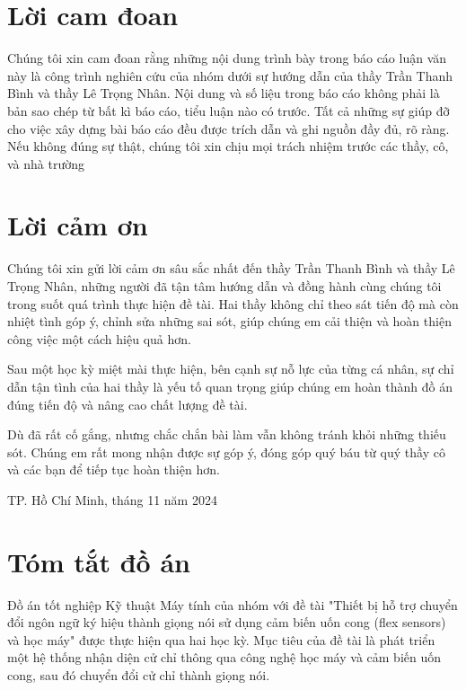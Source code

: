 \documentclass[a4paper]{article}
\begin{document}
\setcounter{page}{1}

\newpage
\section*{Lời cam đoan}

\indent Chúng tôi xin cam đoan rằng những nội dung trình bày trong báo cáo luận văn này là công trình nghiên cứu của nhóm dưới sự hướng dẫn của thầy Trần Thanh Bình và thầy Lê Trọng Nhân. Nội dung và số liệu trong báo cáo không phải là bản sao chép từ bất kì báo cáo, tiểu luận nào có trước. Tất cả những sự giúp đỡ cho việc xây dựng bài báo cáo đều được trích dẫn và ghi nguồn đầy đủ, rõ ràng. Nếu không đúng sự thật, chúng tôi xin chịu mọi trách nhiệm trước các thầy, cô, và nhà trường

\newpage
\section*{Lời cảm ơn}

\indent Chúng tôi xin gửi lời cảm ơn sâu sắc nhất đến thầy Trần Thanh Bình và thầy Lê Trọng Nhân, những người đã tận tâm hướng dẫn và đồng hành cùng chúng tôi trong suốt quá trình thực hiện đề tài. Hai thầy không chỉ theo sát tiến độ mà còn nhiệt tình góp ý, chỉnh sửa những sai sót, giúp chúng em cải thiện và hoàn thiện công việc một cách hiệu quả hơn.

\indent Sau một học kỳ miệt mài thực hiện, bên cạnh sự nỗ lực của từng cá nhân, sự chỉ dẫn tận tình của hai thầy là yếu tố quan trọng giúp chúng em hoàn thành đồ án đúng tiến độ và nâng cao chất lượng đề tài. 

\indent Dù đã rất cố gắng, nhưng chắc chắn bài làm vẫn không tránh khỏi những thiếu sót. Chúng em rất mong nhận được sự góp ý, đóng góp quý báu từ quý thầy cô và các bạn để tiếp tục hoàn thiện hơn.

\begin{center}
{\footnotesize TP. Hồ Chí Minh, tháng 11 năm 2024}
\end{center}

\newpage
\section*{Tóm tắt đồ án}

\indent Đồ án tốt nghiệp Kỹ thuật Máy tính của nhóm với đề tài "Thiết bị hỗ trợ chuyển đổi ngôn ngữ ký hiệu thành giọng nói sử dụng cảm biến uốn cong (flex sensors) và học máy" được thực hiện qua hai học kỳ. Mục tiêu của đề tài là phát triển một hệ thống nhận diện cử chỉ thông qua công nghệ học máy và cảm biến uốn cong, sau đó chuyển đổi cử chỉ thành giọng nói.
\end{document}
